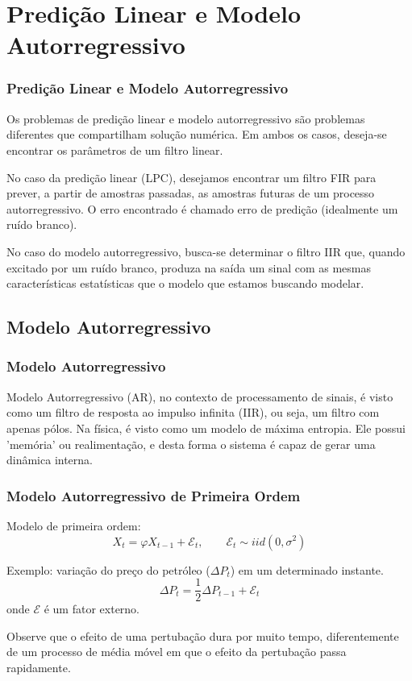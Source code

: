 \section{Predição Linear e Modelo Autorregressivo}

\begin{frame}%
  \frametitle{Predição Linear e Modelo Autorregressivo}

  Os problemas de predição linear e modelo autorregressivo são problemas diferentes 
  que compartilham solução numérica. Em ambos os casos, deseja-se encontrar os parâmetros
  de um filtro linear. 

  No caso da predição linear (LPC), desejamos encontrar um filtro FIR
  para prever, a partir de amostras passadas, as amostras futuras de um processo autorregressivo.
  O erro encontrado é chamado erro de predição (idealmente um ruído branco).

  No caso do modelo autorregressivo, busca-se determinar o filtro IIR que,
  quando excitado por um ruído branco, produza na saída um sinal com as mesmas características
  estatísticas que o modelo que estamos buscando modelar.
\end{frame}

\subsection{Modelo Autorregressivo}
\begin{frame}%
  \frametitle{Modelo Autorregressivo}
  Modelo Autorregressivo (AR), no contexto de processamento de sinais,
  é visto como um filtro de resposta ao impulso infinita (IIR), ou seja,
  um filtro com apenas pólos. Na física, é visto como um modelo de máxima entropia.
  Ele possui 'memória' ou realimentação, e desta forma o sistema é capaz de gerar uma
  dinâmica interna. 
\end{frame}

\begin{frame}%
  \frametitle{Modelo Autorregressivo de Primeira Ordem}
  Modelo de primeira ordem:
  \begin{equation}
  \label{eq-1-ar}
  X_t = \varphi X_{t-1} + \mathcal{E}_t , \quad \quad \mathcal{E}_t \sim iid(0,\sigma^2)
  \end{equation}
  
  Exemplo: variação do preço do petróleo ($\Delta P_t$) em um determinado instante.
  \begin{equation}
  \Delta P_t = \frac{1}{2} \Delta P_{t-1} + \mathcal{E}_t
  \end{equation}
  onde $\mathcal{E}$ é um fator externo.
  
  Observe que o efeito de uma pertubação dura por muito tempo, diferentemente
  de um processo de média móvel em que o efeito da pertubação passa rapidamente.
\end{frame}


